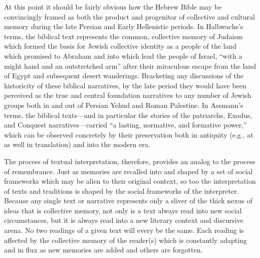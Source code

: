 At this point it should be fairly obvious how the Hebrew Bible may be
convincingly framed as both the product and progenitor of collective and
cultural memory during the late Persian and Early Hellenistic periods.
In Halbwachs's terms, the biblical text represents the common,
collective memory of \secondtemple Judaism which formed the basis
for Jewish collective identity as a people of the land which
\yahweh promised to Abraham and into which
\yahweh lead the people of Israel, ``with a might hand
and an outstretched arm'' after their miraculous escape from the land of
Egypt and subsequent desert wanderings. Bracketing any discussions of
the historicity of these biblical narratives, by the late
\secondtemple period they would have been perceived as the true
and central foundation narratives to any number of Jewish groups both in
and out of Persian Yehud and Roman Palestine. In Assmann's terms, the
biblical texts---and in particular the stories of the patriarchs,
Exodus, and Conquest narratives---carried ``a lasting, normative, and
formative power,''\autocite[38]{assmann2011} which can be observed
concretely by their preservation both in antiquity (e.g., at
\qumran as well in translation) and into the modern era.

The process of textual interpretation, therefore, provides an analog to
the process of remembrance. Just as memories are recalled into and
shaped by a set of social frameworks which may be alien to their
original context, so too the interpretation of texts and traditions is
shaped by the social frameworks of the interpreter. Because any single
text or narrative represents only a sliver of the thick nexus of ideas
that is collective memory, not only is a text always read into new
social circumstances, but it is always read into a new literary context
and discursive arena. No two readings of a given text will every be the
same. Each reading is affected by the collective memory of the reader(s)
which is constantly adapting and in flux as new memories are added and
others are forgotten.

